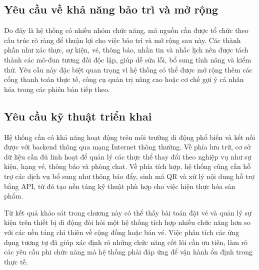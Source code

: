 \documentclass[../DoAn.tex]{subfiles}
\begin{document}
\subsection{Yêu cầu về khả năng bảo trì và mở rộng}
Do đây là hệ thống có nhiều nhóm chức năng, mã nguồn cần được tổ chức theo cấu trúc rõ ràng để thuận lợi cho việc bảo trì và mở rộng sau này. Các thành phần như xác thực, sự kiện, vé, thông báo, nhắn tin và nhắc lịch nên được tách thành các mô-đun tương đối độc lập, giúp dễ sửa lỗi, bổ sung tính năng và kiểm thử. Yêu cầu này đặc biệt quan trọng vì hệ thống có thể được mở rộng thêm các cổng thanh toán thực tế, công cụ quản trị nâng cao hoặc cơ chế gợi ý cá nhân hóa trong các phiên bản tiếp theo.

\begin{samepage}
\subsection{Yêu cầu kỹ thuật triển khai}
Hệ thống cần có khả năng hoạt động trên môi trường di động phổ biến và kết nối được với backend thông qua mạng Internet thông thường. Về phía lưu trữ, cơ sở dữ liệu cần đủ linh hoạt để quản lý các thực thể thay đổi theo nghiệp vụ như sự kiện, hạng vé, thông báo và phòng chat. Về phía tích hợp, hệ thống cũng cần hỗ trợ các dịch vụ bổ sung như thông báo đẩy, sinh mã \gls{QR} và xử lý nội dung hỗ trợ bằng \gls{API}, từ đó tạo nền tảng kỹ thuật phù hợp cho việc hiện thực hóa sản phẩm.


Từ kết quả khảo sát trong chương này có thể thấy bài toán đặt vé và quản lý sự kiện trên thiết bị di động đòi hỏi một hệ thống tích hợp nhiều chức năng hơn so với các nền tảng chỉ thiên về cộng đồng hoặc bán vé. Việc phân tích các ứng dụng tương tự đã giúp xác định rõ những chức năng cốt lõi cần ưu tiên, làm rõ các yêu cầu phi chức năng mà hệ thống phải đáp ứng để vận hành ổn định trong thực tế.
\end{samepage}
\end{document}
